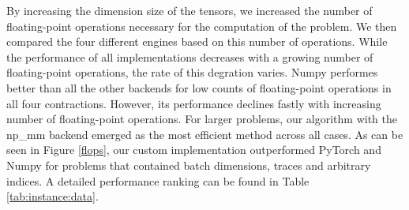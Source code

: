 \noindent By increasing the dimension size of the tensors, we increased the number of floating-point operations necessary for the computation of the problem. We then compared the four different engines based on this number of operations. While the performance of all implementations decreases with a growing number of floating-point operations, the rate of this degration varies. Numpy performes better than all the other backends for low counts of floating-point operations in all four contractions. However, its performance declines fastly with increasing number of floating-point operations. For larger problems, our algorithm with the np\_mm backend emerged as the most efficient method across all cases. As can be seen in Figure \ref{flops}, our custom implementation outperformed PyTorch and Numpy for problems that contained batch dimensions, traces and arbitrary indices. A detailed performance ranking can be found in Table \ref{tab:instance:data}.


